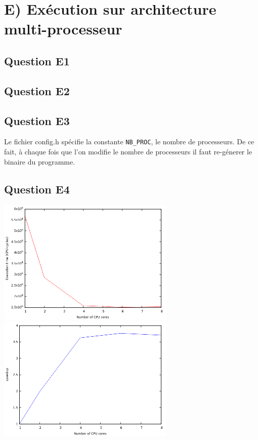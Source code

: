 \documentclass[10pt]{article}
\begin{document}
\section{E) Exécution sur architecture multi-processeur}
\subsection{Question E1}


\newpage

\subsection{Question E2}


\subsection{Question E3}
Le fichier config.h spécifie la constante \texttt{NB\_PROC}, le nombre de
processeurs. De ce fait, à chaque fois que l'on modifie le nombre de processeurs
il faut re-génerer le binaire du programme.
\newpage

\subsection{Question E4}
\begin{center}
  
  \includegraphics[width=8.5cm]{QuestionE4_1.png}
  \quad\quad
  \includegraphics[width=8.5cm]{QuestionE4_2.png}
\end{center}
\end{document}
